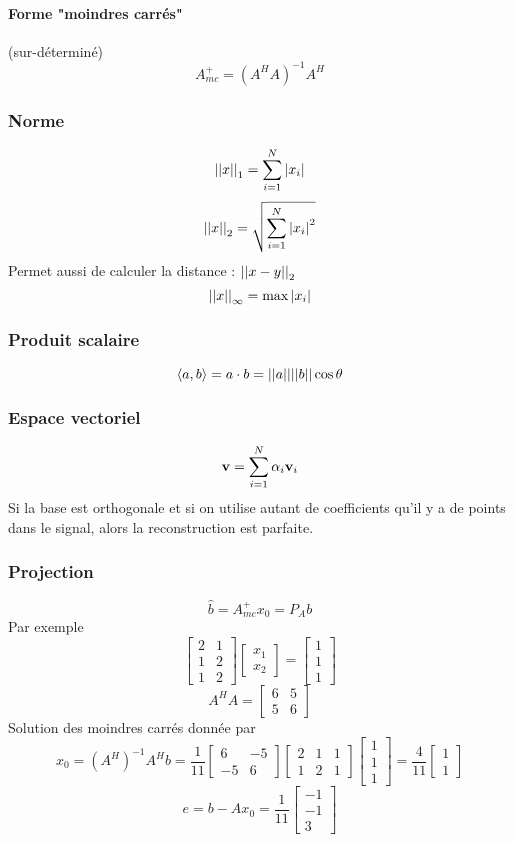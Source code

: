 \documentclass[resume]{subfiles}
\begin{document}
\paragraph{Forme "moindres carrés"} (sur-déterminé)
$$\boxed{A^{+}_{mc}=(A^HA)^{-1}A^H}$$
\subsubsection{Norme}
$$\abs{\abs{x}}_1=\sum_{i=1}^{N}\abs{x_i}$$
$$\abs{\abs{x}}_2=\sqrt{\sum_{i=1}^{N}\abs{x_i}^2}$$
Permet aussi de calculer la distance : $\abs{\abs{x-y}}_2$
$$\abs{\abs{x}}_{\infty}=\max\abs{x_i}$$
\subsubsection{Produit scalaire}
$$\langle a,b \rangle = a\cdot b=\abs{\abs{a}}\abs{\abs{b}}\cos\theta$$
\subsubsection{Espace vectoriel}
$$\bold{v}=\sum_{i=1}^{N}\alpha_i\bold{v}_i$$
Si la base est orthogonale et si on utilise autant de coefficients qu'il y a de points dans le signal, alors la reconstruction est parfaite.
\subsubsection{Projection}
$$\hat{b}=A^{+}_{mc}x_0=P_Ab$$
Par exemple
$$\begin{bmatrix}
2 & 1\\
1 & 2\\
1 & 2
\end{bmatrix}\begin{bmatrix}
x_1\\x_2
\end{bmatrix}=\begin{bmatrix}
1\\1\\1
\end{bmatrix}$$
$$A^{H}A=\begin{bmatrix}
6 & 5\\5 & 6
\end{bmatrix}$$
Solution des moindres carrés donnée par
$$x_0=(A^{H})^{-1}A^{H}b=\frac{1}{11}\begin{bmatrix}
6 & -5\\-5 & 6
\end{bmatrix}\begin{bmatrix}
2 & 1 & 1\\
1 & 2 & 1
\end{bmatrix}\begin{bmatrix}
1\\1\\1
\end{bmatrix}=\frac{4}{11}\begin{bmatrix}
1\\1
\end{bmatrix}$$
$$e=b-Ax_0=\frac{1}{11}\begin{bmatrix}
-1\\-1\\3
\end{bmatrix}$$
\end{document}
